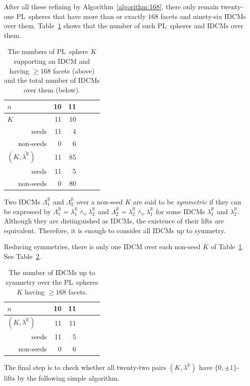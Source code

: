\documentclass[11pt]{amsart}
\theoremstyle{plain}
\numberwithin{equation}{section}
\theoremstyle{definition}
\newcommand{\R}{\mathbb{R}}
\begin{document}
After all these refining by Algorithm~\ref{algorithm:168}, there only remain twenty-one PL~spheres that have more than or exactly $168$ facets and ninety-six IDCMs over them.
Table~\ref{table:IDCM_over_168} shows that the number of such PL~spheres and IDCMs over them.
    \begin{table}[]
		\begin{tabular}{lrrrrrr}
		\toprule
		$n$   &        & 10  &  11  \tabularnewline \midrule
		\multicolumn{2}{l}{$K$}   & 11 & 10 \tabularnewline  \rule{0pt}{3ex}
		&seeds                & 11 & 4 \tabularnewline
		&non-seeds            & 0  & 6 \tabularnewline \midrule
		\multicolumn{2}{l}{$(K, \overline{\lambda^\R})$}  & 11 & 85 \tabularnewline \rule{0pt}{3ex}
		&seeds            & 11 & 5  \tabularnewline
		&non-seeds             & 0  & 80 \tabularnewline
		\bottomrule
	   \end{tabular}
	   \medskip
    \caption{The numbers of PL~sphere $K$ supporting an IDCM and having $\geq 168$ facets (above) and the total number of IDCMs over them (below).} \label{table:IDCM_over_168}
    \end{table}

Two IDCMs $\Lambda_1^\R$ and $\Lambda_2^\R$ over a non-seed $K$ are said to be \emph{symmetric} if they can be expressed by $\Lambda_1^\R = \lambda_1^\R \wedge_v \lambda_2^\R$ and $\Lambda_2^\R = \lambda_2^\R \wedge_v \lambda_1^\R$ for some IDCMs $\lambda_1^\R$ and $\lambda_2^\R$.
Although they are distinguished as IDCMs, the existence of their lifts are equivalent. 
Therefore, it is enough to consider all IDCMs up to symmetry.

Reducing symmetries, there is only one IDCM over each non-seed $K$ of Table~\ref{table:IDCM_over_168}.
See Table~\ref{table:IDCM_up_to_symmetry}.

\begin{table}[]
		\begin{tabular}{lrrrrrr}
		\toprule
		$n$   &        & 10  &  11  \tabularnewline \midrule
		\multicolumn{2}{l}{$(K, \overline{\lambda^\R})$}  & 11 & 11 \tabularnewline \rule{0pt}{3ex}
		&seeds            & 11 & 5  \tabularnewline
		&non-seeds             & 0  & 6 \tabularnewline
		\bottomrule
	\end{tabular}
	\medskip
    \caption{The number of IDCMs up to symmetry over the PL~spheres $K$ having $\geq 168$ facets.} \label{table:IDCM_up_to_symmetry}
\end{table}

The final step is to check whether all twenty-two pairs $(K, \lambda^\R)$ have $\{0, \pm 1\}$-lifts by the following simple algorithm.
\newpage
\end{document}
